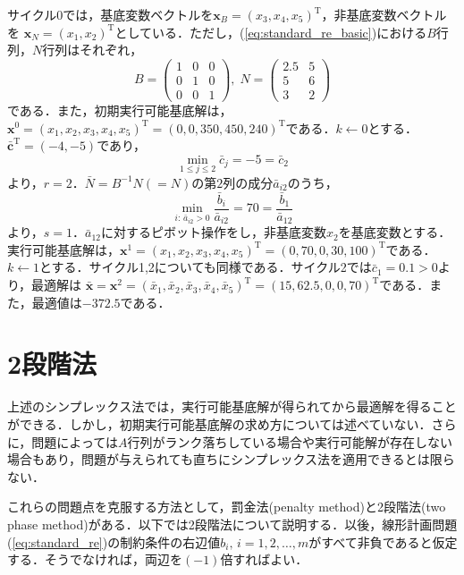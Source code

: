 \documentclass{jsreport}
\begin{document}
サイクル0では，基底変数ベクトルを$\bm{x}_B = (x_3, x_4, x_5)^{\mathrm{T}}$，非基底変数ベクトルを
$\bm{x}_N = (x_1, x_2)^{\mathrm{T}}$としている．ただし，(\ref{eq:standard_re_basic})における$B$行列，$N$行列はそれぞれ，
\begin{equation}
  B = \left(
  \begin{array}{ccc}
    1 & 0 & 0 \\
    0 & 1 & 0 \\
    0 & 0 & 1
  \end{array}
  \right), \; N = \left(
  \begin{array}{cc}
    2.5 & 5 \\
    5   & 6 \\
    3   & 2
  \end{array}
  \right) \nonumber
\end{equation}
である．また，初期実行可能基底解は，$\bm{x}^0 = (x_1, x_2, x_3, x_4, x_5)^{\mathrm{T}} = (0, 0, 350, 450, 240)^{\mathrm{T}}$である．$k \leftarrow 0$とする．
$\bar{\bm{c}}^{\mathrm{T}} = (-4, -5)$であり，
\begin{equation}
  \min_{1 \leq j \leq 2} \bar{c}_{j} = -5 = \bar{c}_2 \nonumber
\end{equation}
より，$r = 2$．$\bar{N} = B^{-1}N (= N)$の第$2$列の成分$\bar{a}_{i2}$のうち，
\begin{equation}
  \min_{i: \, \bar{a}_{i2} > 0} \frac{\bar{b}_i}{\bar{a}_{i2}} =  70 = \frac{\bar{b}_1}{\bar{a}_{12}} \nonumber
\end{equation}
より，$s = 1$．$\bar{a}_{12}$に対するピボット操作をし，非基底変数$x_2$を基底変数とする．
実行可能基底解は，$\bm{x}^1 = (x_1, x_2, x_3, x_4, x_5)^{\mathrm{T}} = (0, 70, 0, 30, 100)^{\mathrm{T}}$である．$k \leftarrow 1$とする．サイクル1,2についても同様である．サイクル2では$\bar{c}_1 = 0.1 > 0$より，最適解は
$\bar{\bm{x}} = \bm{x}^{2} = (\bar{x}_1, \bar{x}_2, \bar{x}_3, \bar{x}_4, \bar{x}_5)^{\mathrm{T}} = (15, 62.5, 0, 0, 70)^{\mathrm{T}}$である．また，最適値は$-372.5$である．

\section{2段階法}
上述のシンプレックス法では，実行可能基底解が得られてから最適解を得ることができる．しかし，初期実行可能基底解の求め方については述べていない．さらに，問題によっては$A$行列がランク落ちしている場合や実行可能解が存在しない場合もあり，問題が与えられても直ちにシンプレックス法を適用できるとは限らない．

これらの問題点を克服する方法として，罰金法(penalty method)と2段階法(two phase method)がある．以下では2段階法について説明する．以後，線形計画問題(\ref{eq:standard_re})の制約条件の右辺値$b_i, \, i = 1, 2, \ldots, m$がすべて非負であると仮定する．そうでなければ，両辺を$(-1)$倍すればよい．
\end{document}
